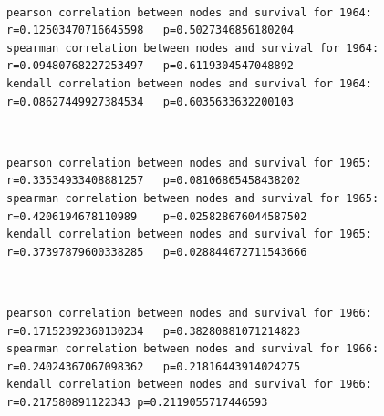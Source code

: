 \documentclass[11pt]{article}
\begin{document}
    \begin{center}
    \end{center}
    { \hspace*{\fill} \\}
    
    \begin{Verbatim}[commandchars=\\\{\}]
pearson correlation between nodes and survival for 1964:
r=0.12503470716645598	p=0.5027346856180204
spearman correlation between nodes and survival for 1964:
r=0.09480768227253497	p=0.6119304547048892
kendall correlation between nodes and survival for 1964:
r=0.08627449927384534	p=0.6035633632200103

    \end{Verbatim}

    \begin{center}
    \end{center}
    { \hspace*{\fill} \\}
    
    \begin{Verbatim}[commandchars=\\\{\}]
pearson correlation between nodes and survival for 1965:
r=0.33534933408881257	p=0.08106865458438202
spearman correlation between nodes and survival for 1965:
r=0.4206194678110989	p=0.025828676044587502
kendall correlation between nodes and survival for 1965:
r=0.37397879600338285	p=0.028844672711543666

    \end{Verbatim}

    \begin{center}
    \end{center}
    { \hspace*{\fill} \\}
    
    \begin{Verbatim}[commandchars=\\\{\}]
pearson correlation between nodes and survival for 1966:
r=0.17152392360130234	p=0.38280881071214823
spearman correlation between nodes and survival for 1966:
r=0.24024367067098362	p=0.21816443914024275
kendall correlation between nodes and survival for 1966:
r=0.217580891122343	p=0.2119055717446593

    \end{Verbatim}
\end{document}

